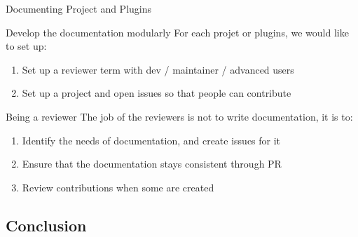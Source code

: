 \documentclass[10pt]{beamer}
\begin{document}
\begin{frame}{Documenting Project and Plugins}
  \begin{tcbProp}{Develop the documentation modularly}
    For each projet or plugins, we would like to set up:
    \begin{enumerate}
      \item Set up a reviewer term with dev / maintainer / advanced users
      \item Set up a project and open issues so that people can contribute
    \end{enumerate}
  \end{tcbProp}
  \begin{tcbProp}{Being a reviewer}
    The job of the reviewers is not to write documentation, it is to:
    \begin{enumerate}
      \item Identify the needs of documentation, and create issues for it
      \item Ensure that the documentation stays consistent through PR
      \item Review contributions when some are created
    \end{enumerate}
  \end{tcbProp}
\end{frame}

\subsection{Conclusion}
\end{document}
